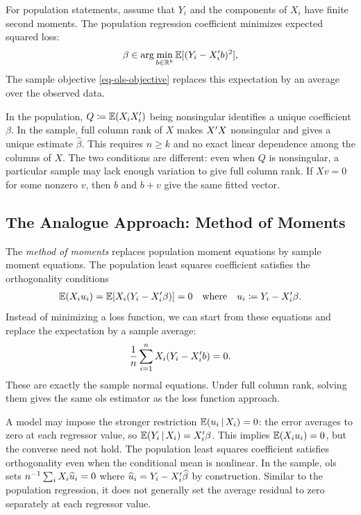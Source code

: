 \documentclass[a4paper,12pt]{article}
\begin{document}
\begin{remark}
	For population statements, assume that $Y_i$ and the components of $X_i$ have finite second moments.
	The population regression coefficient minimizes expected squared loss:
	\begin{align}
		\beta\in\arg\min_{b\in\mathbb{R}^k}\operatorname{\mathbb{E}}[(Y_i-X_i^{\prime} b)^2],
	\end{align}
	The sample objective \eqref{eq-ols-objective} replaces this expectation by an average over the observed data.
\end{remark}

\begin{remark}
	In the population, $Q\coloneqq\operatorname{\mathbb{E}}(X_iX_i^{\prime})$ being nonsingular identifies a unique coefficient $\beta$.
	In the sample, full column rank of $X$ makes $X^{\prime} X$ nonsingular and gives a unique estimate $\widehat\beta$.
	This requires $n\ge k$ and no exact linear dependence among the columns of $X$.
	The two conditions are different: even when $Q$ is nonsingular,
	a particular sample may lack enough variation to give full column rank.
	If $Xv=0$ for some nonzero $v$, then $b$ and $b+v$ give the same fitted vector.
\end{remark}

\subsection{The Analogue Approach: Method of Moments}

The \emph{method of moments} replaces population moment equations by sample moment equations.
The population least squares coefficient satisfies the orthogonality conditions
\begin{align}
	\operatorname{\mathbb{E}}(X_i u_i)=\operatorname{\mathbb{E}}[X_i(Y_i-X_i^{\prime}\beta)]=0
	\quad\text{where}\quad
	u_i\coloneqq Y_i-X_i^{\prime}\beta.
\end{align}
Instead of minimizing a loss function, we can start from these equations
and replace the expectation by a sample average:
\begin{align}\label{eq-sample-orthogonality}
	\frac{1}{n}\sum_{i=1}^n X_i(Y_i-X_i^{\prime} b)=0.
\end{align}
These are exactly the sample normal equations.
Under full column rank, solving them gives the same \gls{ols} estimator as the loss function approach.

\begin{remark}
	A model may impose the stronger restriction $\operatorname{\mathbb{E}}(u_i\mathpunct{}|\mathpunct{} X_i)=0$:
	the error averages to zero at each regressor value, so $\operatorname{\mathbb{E}}(Y_i\mathpunct{}|\mathpunct{} X_i)=X_i^{\prime}\beta$.
	This implies $\operatorname{\mathbb{E}}(X_i u_i)=0$, but the converse need not hold.
	The population least squares coefficient satisfies orthogonality even when the conditional mean is nonlinear.
	In the sample, \gls{ols} sets $n^{-1}\sum_i X_i\widehat u_i=0$
	where $\widehat u_i=Y_i-X_i^{\prime}\widehat\beta$ by construction.
	Similar to the population regression,
	it does not generally set the average residual to zero separately at each regressor value.
\end{remark}
\end{document}
